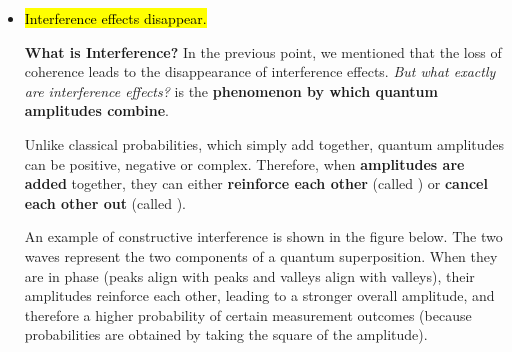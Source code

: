 \begin{itemize}
    In summary, a coherent quantum state and a classical probabilistic mixture \textbf{may produce the same measurement probabilities}, but \hl{only the coherent state contains phase information and can therefore exhibit interference effects.}
    


    
    \item \hl{Interference effects disappear.}\label{def:interference}

    \textcolor{Green3}{ \textbf{What is Interference?}} In the previous point, we mentioned that the loss of coherence leads to the disappearance of interference effects. \emph{But what exactly are interference effects?}  is the \textbf{phenomenon by which quantum amplitudes combine}.

    Unlike classical probabilities, which simply add together, quantum amplitudes can be positive, negative or complex. Therefore, when \textbf{amplitudes are added} together, they can either \textbf{reinforce each other} (called ) or \textbf{cancel each other out} (called ).

    An example of constructive interference is shown in the figure below. The two waves represent the two components of a quantum superposition. When they are in phase (peaks align with peaks and valleys align with valleys), their amplitudes reinforce each other, leading to a stronger overall amplitude, and therefore a higher probability of certain measurement outcomes (because probabilities are obtained by taking the square of the amplitude).

    \begin{center}
    \end{center}


\end{itemize}
